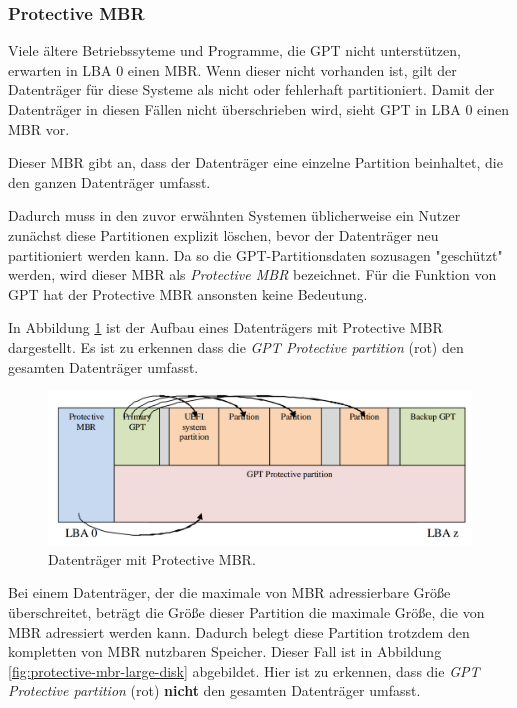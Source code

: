 \newpage
\subsubsection{Protective MBR}
Viele ältere Betriebssyteme und Programme, die GPT nicht unterstützen, erwarten in LBA 0 einen MBR.
Wenn dieser nicht vorhanden ist, gilt der Datenträger für diese Systeme als nicht oder fehlerhaft partitioniert.
Damit der Datenträger in diesen Fällen nicht überschrieben wird, sieht GPT in LBA 0 einen MBR vor.

Dieser MBR gibt an, dass der Datenträger eine einzelne Partition beinhaltet, die den ganzen Datenträger umfasst.

Dadurch muss in den zuvor erwähnten Systemen üblicherweise ein Nutzer zunächst diese Partitionen explizit löschen, bevor der Datenträger neu partitioniert werden kann.
Da so die GPT-Partitionsdaten sozusagen "geschützt" werden, wird dieser MBR als \textit{Protective MBR} bezeichnet.
Für die Funktion von GPT hat der Protective MBR ansonsten keine Bedeutung.

In Abbildung \ref{fig:protective-mbr} ist der Aufbau eines Datenträgers mit Protective MBR dargestellt.
Es ist zu erkennen dass die \textit{GPT Protective partition} (rot) den gesamten Datenträger umfasst.

\begin{figure}[ht!]
    \includegraphics[width=\textwidth]{content/graphics/GPT_Layout_with_protective_MBR.png}
    
    \vspace{-0.2cm}

    \caption{Datenträger mit Protective MBR. \cite{uefi-spec}}
    \label{fig:protective-mbr}
\end{figure}

Bei einem Datenträger, der die maximale von MBR adressierbare Größe überschreitet, beträgt die Größe dieser Partition die maximale Größe, die von MBR adressiert werden kann.
Dadurch belegt diese Partition trotzdem den kompletten von MBR nutzbaren Speicher.
Dieser Fall ist in Abbildung \ref{fig:protective-mbr-large-disk} abgebildet.
Hier ist zu erkennen, dass die \textit{GPT Protective partition} (rot) \textbf{nicht} den gesamten Datenträger umfasst.

